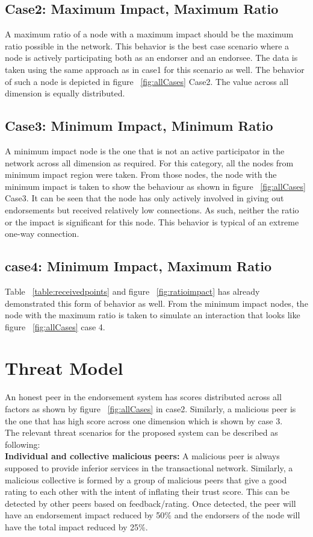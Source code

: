 \subsection{Case2: Maximum Impact, Maximum Ratio}
A maximum ratio of a node with a maximum impact should be the maximum ratio
possible in the network. This behavior is the best case scenario where a node
is actively participating both as an endorser and an endorsee. The data is
taken using the same approach as in case1 for this scenario as well. The
behavior of such a node is depicted in figure ~\ref{fig:allCases} Case2. The
value across all dimension is equally distributed. 
\subsection{Case3: Minimum Impact, Minimum Ratio}
A minimum impact node is the one that is not an active participator in the
network across all dimension as required. For this category, all the nodes from
minimum impact region were taken. From those nodes, the node with the minimum
impact is taken to show the behaviour as shown in figure ~\ref{fig:allCases}
Case3. It can be seen that the node has only actively involved in giving out
endorsements but received relatively low connections. As such, neither the
ratio or the impact is significant for this node. This behavior is typical of
an extreme one-way connection. 
\subsection{case4: Minimum Impact, Maximum Ratio}
Table ~\ref{table:receivedpoints}  and figure ~\ref{fig:ratioimpact} has
already demonstrated this form of behavior as well. From the minimum impact
nodes, the node with the maximum ratio is taken to simulate an interaction that
looks like figure ~\ref{fig:allCases} case 4.

\section{Threat Model}\label{sec:threatModel}
An honest peer in the endorsement system has scores distributed across all
factors as shown by figure ~\ref{fig:allCases} in case2. Similarly, a malicious
peer is the one that has high score across one dimension which is shown by case
3.\\
The relevant threat scenarios for the proposed system can be described as
following: \\
\textbf{Individual and collective malicious peers\cite{marmol2009security}:}
A malicious peer is always supposed to provide inferior services in the
transactional network. Similarly, a malicious collective is formed by a group
of malicious peers that give a good rating to each other with the intent of
inflating their trust score. This can be detected by other peers based on
feedback/rating. Once detected, the peer will have an endorsement impact
reduced by 50\% and the endorsers of the node will have the total impact
reduced by 25\%.

